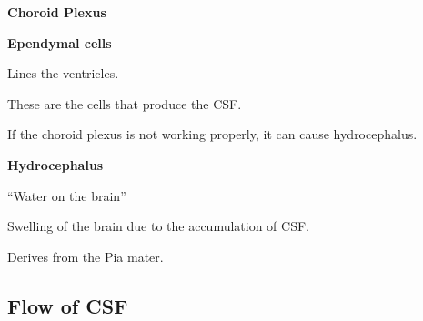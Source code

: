 \begin{coloredlist}
    \item \textbf{Choroid Plexus}
    \begin{coloredlist}
        \item \textbf{Ependymal cells}
        \begin{coloredlist}
            \item Lines the ventricles.
            \item These are the cells that produce the CSF.
        \end{coloredlist}
        \item If the choroid plexus is not working properly, it can cause hydrocephalus.
        \item \textbf{Hydrocephalus}
        \begin{coloredlist}
            \item ``Water on the brain''
            \item Swelling of the brain due to the accumulation of CSF.
        \end{coloredlist}
        \item Derives from the Pia mater.


    \end{coloredlist}
\end{coloredlist}

\subsection{Flow of CSF}

